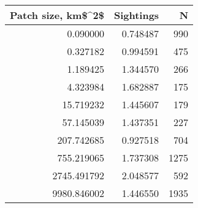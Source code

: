 \begin{tabular}{rrr}
\toprule
 Patch size, km\$\textasciicircum 2\$ &  Sightings &    N \\
\midrule
           0.090000 &   0.748487 &  990 \\
           0.327182 &   0.994591 &  475 \\
           1.189425 &   1.344570 &  266 \\
           4.323984 &   1.682887 &  175 \\
          15.719232 &   1.445607 &  179 \\
          57.145039 &   1.437351 &  227 \\
         207.742685 &   0.927518 &  704 \\
         755.219065 &   1.737308 & 1275 \\
        2745.491792 &   2.048577 &  592 \\
        9980.846002 &   1.446550 & 1935 \\
\bottomrule
\end{tabular}
